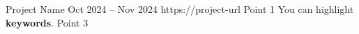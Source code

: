 \resumeProject
{Project Name}
{}
{Oct 2024 -- Nov 2024}
{https://project-url}
\vspace{0.5mm}
\resumeItemListStart
\point Point 1
\point You can highlight \textbf{keywords}.
\point Point 3
\resumeItemListEnd

